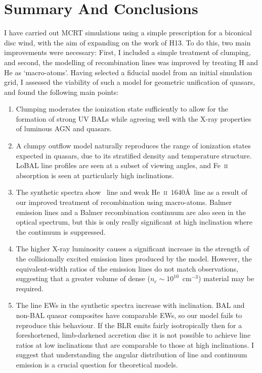 \section{Summary And Conclusions}
\label{sec:qso_conclusions}
I have carried out MCRT simulations using a simple
prescription for a biconical disc wind, with
the aim of expanding on the work of H13. To do this, two main
improvements were necessary: First, I included a simple treatment of 
clumping, and second, 
the modelling of recombination lines was improved by treating H and He as
`macro-atoms'. 
Having selected a fiducial model from an initial simulation grid,
I assessed the viability of such a model for geometric 
unification of quasars, and found the following main points:
\begin{enumerate}
\item Clumping moderates the ionization state
sufficiently to allow for the 
formation of strong UV BALs while agreeing well with the X-ray
properties of luminous AGN and quasars. 
\smallskip
\item A clumpy outflow model naturally 
reproduces the range of ionization states
expected in quasars, due to its stratified density
and temperature structure. 
LoBAL line profiles are seen at a subset of viewing angles, and Fe~\textsc{ii}
absorption is seen at particularly high inclinations. 
\smallskip
\item The synthetic spectra show \la\ line and weak He~\textsc{ii}~$1640$\AA\ line
as a result of our improved treatment of recombination using macro-atoms. 
Balmer emission lines and a Balmer recombination continuum are also
seen in the optical spectrum, but this
is only really significant at high inclination where 
the continuum is suppressed.  
\smallskip
\item The higher X-ray luminosity causes a significant 
increase in the strength of the collisionally excited emission
lines produced by the model. 
However, the equivalent-width ratios of the emission lines do not match
observations, suggesting that a greater volume of dense ($n_e\sim10^{10}$~cm$^{-3}$)
material may be required.
\smallskip
\item The line EWs in the synthetic spectra increase with inclination.
BAL and non-BAL quasar composites have comparable EWs, so our model
fails to reproduce this behaviour.
 If the BLR emits fairly isotropically then for a 
foreshortened, limb-darkened accretion disc 
it is not possible to achieve line ratios at low inclinations 
that are comparable to those at high inclinations. 
I suggest that understanding the angular distribution of 
line and continuum emission is a crucial question for theoretical models.
\end{enumerate}
